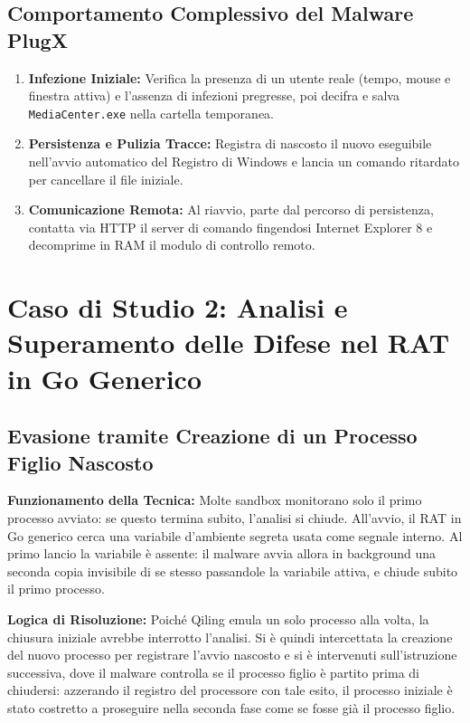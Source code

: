 \documentclass[11pt, a4paper]{article}
\begin{document}
	\subsection{Comportamento Complessivo del Malware PlugX}
	
	\begin{enumerate}
		\item \textbf{Infezione Iniziale:} Verifica la presenza di un utente reale (tempo, mouse e finestra attiva) e l'assenza di infezioni pregresse, poi decifra e salva \texttt{MediaCenter.exe} nella cartella temporanea.
		\item \textbf{Persistenza e Pulizia Tracce:} Registra di nascosto il nuovo eseguibile nell'avvio automatico del Registro di Windows e lancia un comando ritardato per cancellare il file iniziale.
		\item \textbf{Comunicazione Remota:} Al riavvio, parte dal percorso di persistenza, contatta via HTTP il server di comando fingendosi Internet Explorer 8 e decomprime in RAM il modulo di controllo remoto.
	\end{enumerate}
	
	\section{Caso di Studio 2: Analisi e Superamento delle Difese nel RAT in Go Generico}
	
	\subsection{Evasione tramite Creazione di un Processo Figlio Nascosto}
	
	\textbf{Funzionamento della Tecnica:} Molte sandbox monitorano solo il primo processo avviato: se questo termina subito, l'analisi si chiude. All'avvio, il RAT in Go generico cerca una variabile d'ambiente segreta usata come segnale interno. Al primo lancio la variabile è assente: il malware avvia allora in background una seconda copia invisibile di se stesso passandole la variabile attiva, e chiude subito il primo processo.
	
	\textbf{Logica di Risoluzione:} Poiché Qiling emula un solo processo alla volta, la chiusura iniziale avrebbe interrotto l'analisi. Si è quindi intercettata la creazione del nuovo processo per registrare l'avvio nascosto e si è intervenuti sull'istruzione successiva, dove il malware controlla se il processo figlio è partito prima di chiudersi: azzerando il registro del processore con tale esito, il processo iniziale è stato costretto a proseguire nella seconda fase come se fosse già il processo figlio.
	
\end{document}
